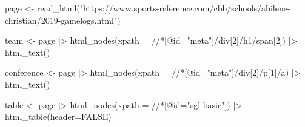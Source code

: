 \documentclass[
  letterpaper,
  DIV=11,
  numbers=noendperiod]{scrreprt}
\newenvironment{Shaded}{\begin{snugshade}}{\end{snugshade}}
\newcommand{\AttributeTok}[1]{\textcolor[rgb]{0.40,0.45,0.13}{#1}}
\newcommand{\ConstantTok}[1]{\textcolor[rgb]{0.56,0.35,0.01}{#1}}
\newcommand{\FunctionTok}[1]{\textcolor[rgb]{0.28,0.35,0.67}{#1}}
\newcommand{\NormalTok}[1]{\textcolor[rgb]{0.00,0.23,0.31}{#1}}
\newcommand{\OtherTok}[1]{\textcolor[rgb]{0.00,0.23,0.31}{#1}}
\newcommand{\SpecialCharTok}[1]{\textcolor[rgb]{0.37,0.37,0.37}{#1}}
\newcommand{\StringTok}[1]{\textcolor[rgb]{0.13,0.47,0.30}{#1}}
\begin{document}
\begin{Shaded}
\begin{Highlighting}[]
\NormalTok{page }\OtherTok{\textless{}{-}} \FunctionTok{read\_html}\NormalTok{(}\StringTok{"https://www.sports{-}reference.com/cbb/schools/abilene{-}christian/2019{-}gamelogs.html"}\NormalTok{)}
  
\NormalTok{team }\OtherTok{\textless{}{-}}\NormalTok{ page }\SpecialCharTok{|\textgreater{}}
  \FunctionTok{html\_nodes}\NormalTok{(}\AttributeTok{xpath =} \StringTok{\textquotesingle{}//*[@id="meta"]/div[2]/h1/span[2]\textquotesingle{}}\NormalTok{) }\SpecialCharTok{|\textgreater{}}
  \FunctionTok{html\_text}\NormalTok{()}

\NormalTok{conference }\OtherTok{\textless{}{-}}\NormalTok{ page }\SpecialCharTok{|\textgreater{}}
    \FunctionTok{html\_nodes}\NormalTok{(}\AttributeTok{xpath =} \StringTok{\textquotesingle{}//*[@id="meta"]/div[2]/p[1]/a\textquotesingle{}}\NormalTok{) }\SpecialCharTok{|\textgreater{}}
    \FunctionTok{html\_text}\NormalTok{()}

\NormalTok{table }\OtherTok{\textless{}{-}}\NormalTok{ page }\SpecialCharTok{|\textgreater{}}
  \FunctionTok{html\_nodes}\NormalTok{(}\AttributeTok{xpath =} \StringTok{\textquotesingle{}//*[@id="sgl{-}basic"]\textquotesingle{}}\NormalTok{) }\SpecialCharTok{|\textgreater{}}
  \FunctionTok{html\_table}\NormalTok{(}\AttributeTok{header=}\ConstantTok{FALSE}\NormalTok{)}


\end{Highlighting}
\end{Shaded}
\end{document}
